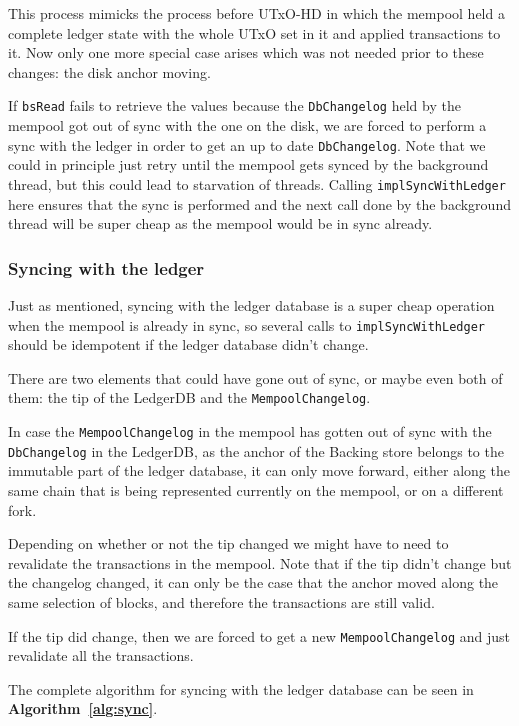 \documentclass[11pt,a4paper]{article}
\newcommand{\htt}[1]{\texttt{#1}}
\theoremstyle{definition}
\begin{document}
This process mimicks the process before UTxO-HD in which the mempool held a
complete ledger state with the whole UTxO set in it and applied transactions to
it. Now only one more special case arises which was not needed prior to these
changes: the disk anchor moving.

If \htt{bsRead} fails to retrieve the values because the \htt{DbChangelog} held
by the mempool got out of sync with the one on the disk, we are forced to
perform a sync with the ledger in order to get an up to date \htt{DbChangelog}.
Note that we could in principle just retry until the mempool gets synced by the
background thread, but this could lead to starvation of threads. Calling
\htt{implSyncWithLedger} here ensures that the sync is performed and the next
call done by the background thread will be super cheap as the mempool would be
in sync already.

\subsubsection{Syncing with the ledger}

Just as mentioned, syncing with the ledger database is a super cheap operation
when the mempool is already in sync, so several calls to
\htt{implSyncWithLedger} should be idempotent if the ledger database didn't
change.

There are two elements that could have gone out of sync, or maybe even both of
them: the tip of the LedgerDB and the \htt{MempoolChangelog}.

In case the \htt{MempoolChangelog} in the mempool has gotten out of sync with
the \htt{DbChangelog} in the LedgerDB, as the anchor of the Backing store
belongs to the immutable part of the ledger database, it can only move forward,
either along the same chain that is being represented currently on the mempool,
or on a different fork.

Depending on whether or not the tip changed we might have to need to revalidate
the transactions in the mempool. Note that if the tip didn't change but the
changelog changed, it can only be the case that the anchor moved along the same
selection of blocks, and therefore the transactions are still valid.

If the tip did change, then we are forced to get a new \htt{MempoolChangelog}
and just revalidate all the transactions.

The complete algorithm for syncing with the ledger database can be seen in \textbf{Algorithm~\ref{alg:sync}}.
\end{document}
